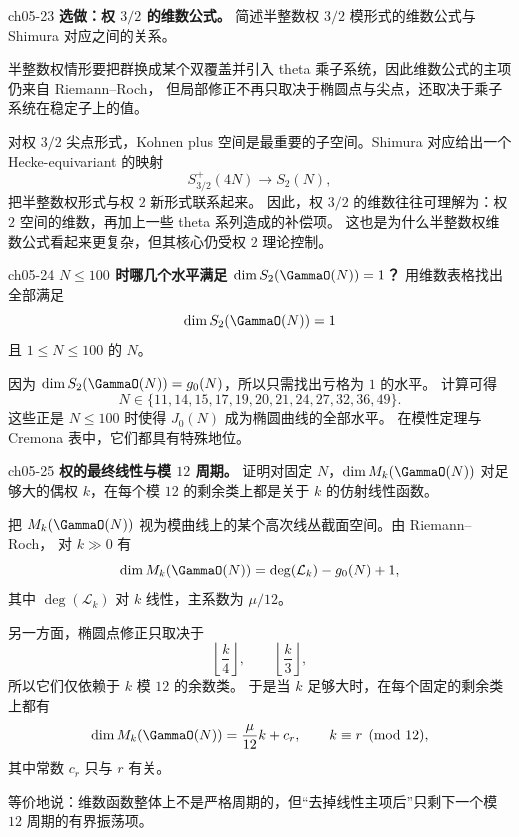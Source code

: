 \begin{problem}{ch05-23}
\textbf{选做：权 $3/2$ 的维数公式。}
简述半整数权 $3/2$ 模形式的维数公式与 Shimura 对应之间的关系。
\end{problem}
\begin{solution}
半整数权情形要把群换成某个双覆盖并引入 theta 乘子系统，因此维数公式的主项仍来自 Riemann--Roch，
但局部修正不再只取决于椭圆点与尖点，还取决于乘子系统在稳定子上的值。

对权 $3/2$ 尖点形式，Kohnen plus 空间是最重要的子空间。Shimura 对应给出一个 Hecke-equivariant 的映射
\[
S_{3/2}^{+}(4N)\longrightarrow S_2(N),
\]
把半整数权形式与权 $2$ 新形式联系起来。
因此，权 $3/2$ 的维数往往可理解为：权 $2$ 空间的维数，再加上一些 theta 系列造成的补偿项。
这也是为什么半整数权维数公式看起来更复杂，但其核心仍受权 $2$ 理论控制。
\end{solution}

\begin{problem}{ch05-24}
\textbf{$N\le 100$ 时哪几个水平满足 $\dim S_2(\GammaO(N))=1$？}
用维数表格找出全部满足
\[
\dim S_2(\GammaO(N))=1
\]
且 $1\le N\le 100$ 的 $N$。
\end{problem}
\begin{solution}
因为 $\dim S_2(\GammaO(N))=g_0(N)$，所以只需找出亏格为 $1$ 的水平。
计算可得
\[
N\in\{11,14,15,17,19,20,21,24,27,32,36,49\}.
\]
这些正是 $N\le100$ 时使得 $J_0(N)$ 成为椭圆曲线的全部水平。
在模性定理与 Cremona 表中，它们都具有特殊地位。
\end{solution}

\begin{problem}{ch05-25}
\textbf{权的最终线性与模 $12$ 周期。}
证明对固定 $N$，$\dim M_k(\GammaO(N))$ 对足够大的偶权 $k$，在每个模 $12$ 的剩余类上都是关于 $k$ 的仿射线性函数。
\end{problem}
\begin{solution}
把 $M_k(\GammaO(N))$ 视为模曲线上的某个高次线丛截面空间。由 Riemann--Roch，
对 $k\gg 0$ 有
\[
\dim M_k(\GammaO(N))=\deg(\mathcal L_k)-g_0(N)+1,
\]
其中 $\deg(\mathcal L_k)$ 对 $k$ 线性，主系数为 $\mu/12$。

另一方面，椭圆点修正只取决于
\[
\left\lfloor \frac{k}{4}\right\rfloor,
\qquad
\left\lfloor \frac{k}{3}\right\rfloor,
\]
所以它们仅依赖于 $k$ 模 $12$ 的余数类。
于是当 $k$ 足够大时，在每个固定的剩余类上都有
\[
\dim M_k(\GammaO(N))=\frac{\mu}{12}k+c_r,
\qquad k\equiv r\pmod{12},
\]
其中常数 $c_r$ 只与 $r$ 有关。

等价地说：维数函数整体上不是严格周期的，但“去掉线性主项后”只剩下一个模 $12$ 周期的有界振荡项。
\end{solution}

